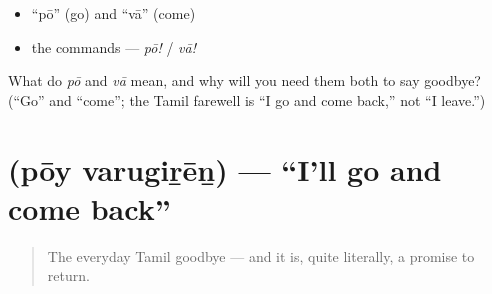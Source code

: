 \begin{itemize}
\raggedright
  \item \textquotedblleft{}pō\textquotedblright{} (go) and \textquotedblleft{}vā\textquotedblright{} (come)
  \item the commands — \emph{pō!} / \emph{vā!}
\end{itemize}

\begin{tcolorbox}[breakable,colback=teal!4,colframe=teal!35!black,title={Before you move on}]
What do \emph{pō} and \emph{vā} mean, and why will you need them both to say goodbye? (\textquotedblleft{}Go\textquotedblright{} and \textquotedblleft{}come\textquotedblright{}; the Tamil farewell is \textquotedblleft{}I go and come back,\textquotedblright{} not \textquotedblleft{}I leave.\textquotedblright{})
\end{tcolorbox}
\section[\texorpdfstring{\ta{போய்} \ta{வருகிறேன்} (pōy varugiṟēṉ)}{போய் வருகிறேன் (pōy varugiṟēṉ)}]{  (pōy varugiṟēṉ) — \textquotedblleft{}I'll go and come back\textquotedblright{}}

\label{lesson:TA-C04-poy-varugiren}



\begin{quote}
The everyday Tamil goodbye — and it is, quite literally, a promise to return.
\end{quote}

